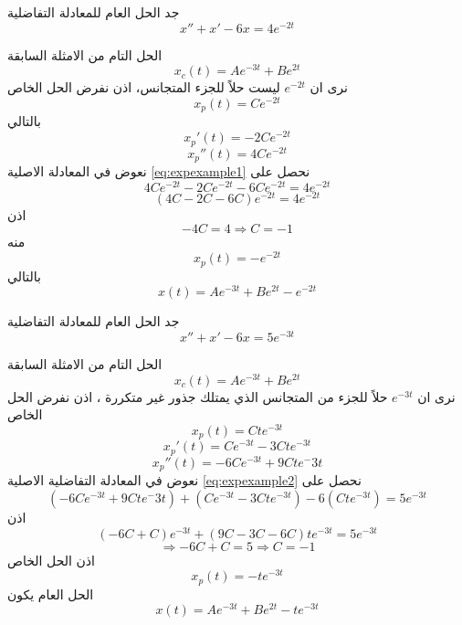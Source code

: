 \begin{example}
	جد الحل العام للمعادلة التفاضلية
	\begin{equation}
		\label{eq:expexample1}
		x'' + x' - 6x = 4 e^{-2t}
	\end{equation}
\end{example}
\newpage
\begin{solution}
	الحل التام من الامثلة السابقة
	\[
	x_c(t) = A e^{-3t} + B e^{2t}
	\]
	نرى ان $e^{-2t}$ ليست حلاً للجزء المتجانس، اذن نفرض الحل الخاص
	\[
	x_p(t) = C e^{-2t}
	\]
	بالتالي
	\[
	x_p'(t) = -2C e^{-2t}
	\]
	\[
	x_p''(t) = 4C e^{-2t}
	\]
	نعوض في المعادلة الاصلية \eqref{eq:expexample1} نحصل على 
	\[
	4 C e^{-2t} -2  C e^{-2t} -6 C e^{-2t} =  4e^{-2t}
	\]
	\[
	(4C -2C - 6C)  e^{-2t} = 4 e^{-2t}
	\]
	اذن
	\[
	-4C = 4 \Rightarrow C =- 1
	\]
	منه
	\[
	x_p(t) =  -e^{-2t}
	\]
	بالتالي
	\[
	x(t) = A e^{-3t} + B e^{2t} -e^{-2t}
	\]
\end{solution}

\begin{example}
	جد الحل العام للمعادلة التفاضلية
	\begin{equation}
		\label{eq:expexample2}
		x'' + x' - 6x = 5 e^{-3t}
	\end{equation}
\end{example}

\begin{solution}
	الحل التام من الامثلة السابقة
	\[
	x_c(t) = A e^{-3t} + B e^{2t}
	\]
	نرى ان $e^{-3t}$ حلاً للجزء من المتجانس الذي يمتلك جذور غير متكررة ، اذن نفرض الحل الخاص
	\[
	x_p(t) = C t e^{-3t}
	\]
	\[
	x_p'(t) = C e^{-3t} - 3C t e^{-3t}
	\]
	\[
	x_p''(t) = -6C e^{-3t} + 9C te^-{3t}
	\]
	نعوض في المعادلة التفاضلية الاصلية \eqref{eq:expexample2} نحصل على
\[
	(-6C e^{-3t} + 9C te^-{3t}) + (C e^{-3t} - 3C t e^{-3t}) 
-6(C t e^{-3t}) = 5 e^{-3t}
\]
اذن
\[
(-6C + C)e^{-3t} + (9C - 3C - 6C) te^{-3t} = 5 e^{-3t}
\]
\[
\Rightarrow -6C + C = 5 \Rightarrow C =-1
\]
اذن الحل الخاص
\[
x_p(t) = -t e^{-3t}
\]
الحل العام يكون
\[
x(t) = A e^{-3t} + B e^{2t} - t e^{-3t}
\]
\end{solution}

